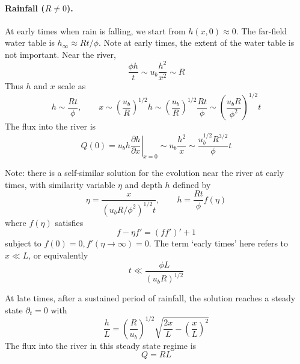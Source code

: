 \documentclass{jknotes}
\begin{document}
\paragraph{Rainfall ($R \ne 0$).}
At early times when rain is falling, we start from $h(x,0) \approx 0$. The
far-field water table is $h_\infty \approx Rt/\phi$. Note at early times, the
extent of the water table is not important. Near the river,
\begin{equation}
	\frac{\phi h}{t} \sim u_b \frac{h^2}{x^2} \sim R
\end{equation}
Thus $h$ and $x$ scale as
\begin{equation}
	h \sim \frac{Rt}{\phi}, \hspace{2em} x \sim
	\left(\frac{u_b}{R}\right)^{1/2} h \sim
	\left(\frac{u_b}{R}\right)^{1/2}\frac{Rt}{\phi} \sim \left(\frac{u_b
	R}{\phi^2}\right)^{1/2} t
\end{equation}
The flux into the river is
\begin{equation}
	Q(0) = u_b h \left.\frac{\partial h}{\partial x} \right|_{x=0} \sim
	u_b\frac{h^2}{x} \sim \frac{u_b^{1/2} R^{3/2}}{\phi} t
\end{equation}

Note: there is a self-similar solution for the evolution near the river at
early times, with similarity variable $\eta$ and depth $h$ defined by
\begin{equation}
	\eta = \frac{x}{(u_bR/\phi^2)^{1/2} t}, \hspace{2em} h = \frac{Rt}{\phi}
	f(\eta)
\end{equation}
where $f(\eta)$ satisfies
\begin{equation}
	f - \eta f' = (ff')' + 1
\end{equation}
subject to $f(0) = 0, f'(\eta \to \infty) = 0$. The term `early times' here
refers to $x \ll L$, or equivalently
\begin{equation}
	t \ll \frac{\phi L}{(u_b R)^{1/2}}
\end{equation}

At late times, after a sustained period of rainfall, the solution reaches a
steady state $\partial_t = 0$ with
\begin{equation}
	\frac{h}{L} = \left(\frac{R}{u_b}\right)^{1/2} \sqrt{\frac{2x}{L} -
	\left(\frac{x}{L}\right)^2}
\end{equation}
The flux into the river in this steady state regime is
\begin{equation}
	Q = RL
\end{equation}
\end{document}
